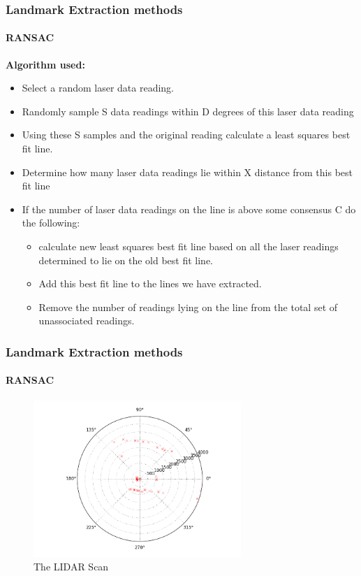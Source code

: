 \documentclass{beamer}
\begin{document}
		\begin{frame}[shrink]
			\frametitle{Landmark Extraction methods}
			\framesubtitle{RANSAC}
			\textbf{Algorithm used:}
			\begin{algorithmic}
				\begin{itemize}
				\item Select a random laser data reading. 
				\item Randomly sample S data readings within D degrees of this laser 
				data reading 
				\item Using these S samples and the original reading calculate a 
				least squares best fit line. 
				\item Determine how many laser data readings lie within X distance 
				from this best fit line
				\item If the number of laser data readings on the line is above some 
				consensus C do the following: 
					\begin{itemize}
						\item calculate new least squares best fit line based on all 
						the laser readings determined to lie on the old best fit 
						line. 
						\item Add this best fit line to the lines we have extracted. 
						\item Remove the number of readings lying on the line from the 
						total set of unassociated readings.
					\end{itemize}
				\end{itemize}
				\EndWhile
			\end{algorithmic}
		\end{frame}
		
		\begin{frame}
			\frametitle{Landmark Extraction methods}
			\framesubtitle{RANSAC}
			\begin{figure}
				\includegraphics[width=0.7\textwidth,height=0.7\textheight]{1Scan}
				\caption{The LIDAR Scan}
			\end{figure}
		\end{frame}
		
\end{document}
